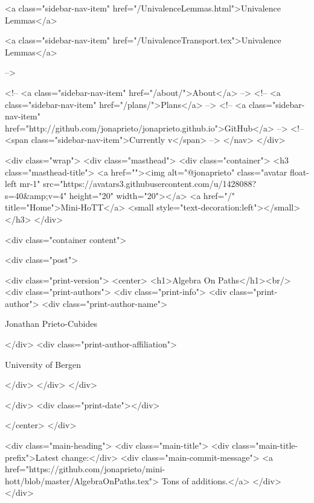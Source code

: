       
    
      
        
          <a class="sidebar-nav-item" href="/UnivalenceLemmas.html">Univalence Lemmas</a>
        
      
    
      
        
          <a class="sidebar-nav-item" href="/UnivalenceTransport.tex">Univalence Lemmas</a>
        
      
     -->

    <!-- <a class="sidebar-nav-item" href="/about/">About</a> -->
    <!-- <a class="sidebar-nav-item" href="/plans/">Plans</a> -->
    <!-- <a class="sidebar-nav-item" href="http://github.com/jonaprieto/jonaprieto.github.io">GitHub</a> -->
    <!-- <span class="sidebar-nav-item">Currently v</span> -->
  </nav>
</div>

    <div class="wrap">
      <div class="masthead">
        <div class="container">
          <h3 class="masthead-title">
            <a href=""><img alt="@jonaprieto" class="avatar float-left mr-1" src="https://avatars3.githubusercontent.com/u/1428088?s=40&amp;v=4" height="20" width="20"></a>
            <a href="/" title="Home">Mini-HoTT</a>
            <small style="text-decoration:left"></small>
          </h3>
        </div>
      
      <div class="container content">
        







<div class="post">

  <div class="print-version">
    <center>
      <h1>Algebra On Paths</h1><br/>
        <div class="print-authors">
          <div class="print-info">
            <div class="print-author">
              <div class="print-author-name">
                
                  Jonathan Prieto-Cubides
                
              </div>
              <div class="print-author-affiliation">
                
                  University of Bergen
                
                </div>
            </div>
          </div>
          
          
        </div>
        <div class="print-date"></div>
        
        
    </center>
  </div>

  
  <div class="main-heading">
    <div class="main-title">
      <div class="main-title-prefix">Latest change:</div>
      <div class="main-commit-message">
            <a href="https://github.com/jonaprieto/mini-hott/blob/master/AlgebraOnPaths.tex">
              Tons of additions.</a>
      </div>
    </div>

